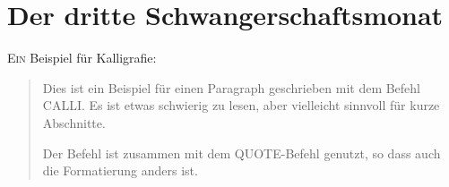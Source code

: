 \chapter*{Der dritte Schwangerschaftsmonat}
\lettrine[lines=2, loversize=0.3, lraise=0]{\initfamily E}{in} Beispiel für Kalligrafie:


\begin{quote} \calli

Dies ist ein Beispiel für einen Paragraph geschrieben mit dem Befehl CALLI. Es ist etwas schwierig zu lesen, aber vielleicht sinnvoll für kurze Abschnitte.

Der Befehl ist zusammen mit dem QUOTE-Befehl genutzt, so dass auch die Formatierung anders ist.
\end{quote}


